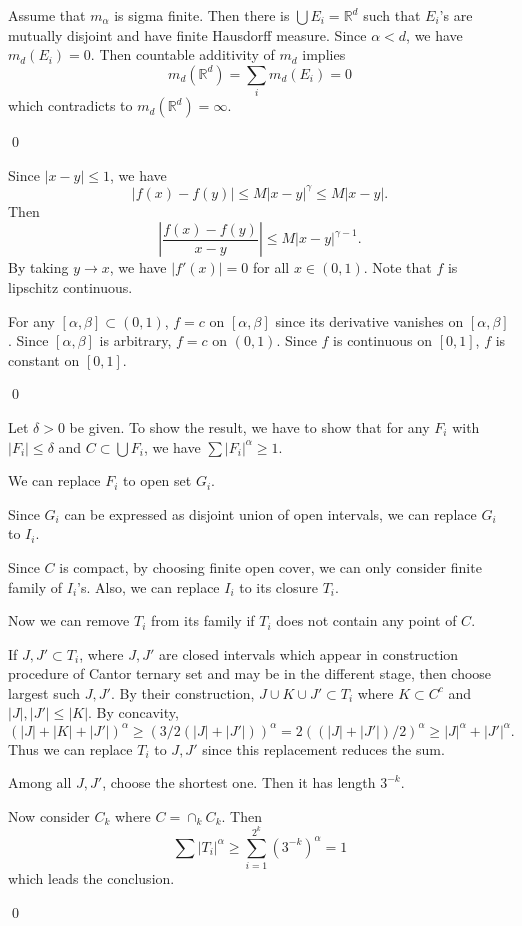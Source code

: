 \begin{exercise}[7.1] \hfill

	Assume that $m_\alpha$ is sigma finite.
	Then there is $\bigcup E_i = \mathbb{R}^d$ such that $E_i$'s are mutually disjoint and have finite Hausdorff measure.
	Since $\alpha < d$, we have $m_d (E_i) = 0$.
	Then countable additivity of $m_d$ implies
	\[
		m_d(\mathbb{R}^d) = \sum_i m_d(E_i) = 0
	\]
	which contradicts to $m_d(\mathbb{R}^d) = \infty$.
	
	\qed	
\end{exercise}

\begin{exercise}[7.3] \hfill
	
	Since $|x-y| \le 1$, we have
	\[
		|f(x)- f(y)| \le M|x-y|^\gamma \le M|x-y|.
	\]
	Then
	\[
		\left \lvert \frac{f(x) - f(y)}{x-y} \right \lvert \le M|x-y|^{\gamma-1}.
	\]
	By taking $y\rightarrow x$, we have $|f'(x)| = 0$ for all $x\in (0, 1)$.
	Note that $f$ is lipschitz continuous.

	For any $[\alpha, \beta] \subset \left( 0, 1 \right)$, $f = c$ on $\left[ \alpha, \beta \right]$
	since its derivative vanishes on $\left[ \alpha, \beta \right]$.
	Since $[\alpha, \beta]$ is arbitrary, $f = c$ on $(0, 1)$.
	Since $f$ is continuous on $[0, 1]$, $f$ is constant on $[0, 1]$.
	
	\qed
\end{exercise}

\begin{exercise}[7.7] \hfill
	
	Let $\delta>0$ be given.
	To show the result, we have to show that for any $F_i$ with $|F_i| \le \delta$ and $C \subset \bigcup F_i$,
	we have $\sum |F_i|^\alpha \ge 1$.

	We can replace $F_i$ to open set $G_i$.

	Since $G_i$ can be expressed as disjoint union of open intervals,
	we can replace $G_i$ to $I_i$.

	Since $C$ is compact, by choosing finite open cover, we can only consider finite family of $I_i$'s.
	Also, we can replace $I_i$ to its closure $T_i$.

	Now we can remove $T_i$ from its family if $T_i$ does not contain any point of $C$.

	If $J, J' \subset T_i$, where $J, J'$ are closed intervals which appear in construction procedure of Cantor ternary set and may be in the different stage,
	then choose largest such $J, J'$.
	By their construction, $J\cup K \cup J' \subset T_i$ where $K \subset C^c$ and $|J|, |J'| \le |K|$.
	By concavity,
	\[
		(|J| + |K| + |J'|)^\alpha \ge (3/2 (|J|+|J'|))^\alpha = 2\left( (|J|+|J'|)/2 \right)^\alpha
		\ge |J|^\alpha + |J'|^\alpha.
	\]
	Thus we can replace $T_i$ to $J, J'$ since this replacement reduces the sum.

	Among all $J, J'$, choose the shortest one.
	Then it has length $3^{-k}$.

	Now consider $C_k$ where $C = \cap_k C_k$.
	Then
	\[
		\sum |T_i|^\alpha \ge \sum_{i=1}^{2^k}(3^{-k})^\alpha = 1
	\]
	which leads the conclusion.

	\qed
\end{exercise}

